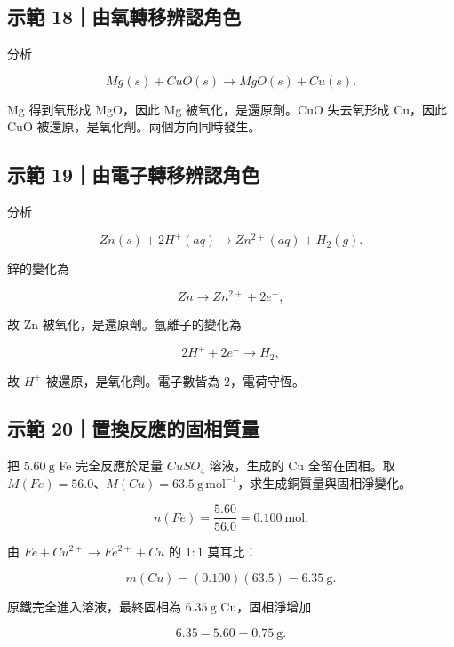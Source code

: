 \documentclass[11pt,a4paper]{article}
\begin{document}
\begin{HandoutWorkedExample}

\subsection{示範 18｜由氧轉移辨認角色}\label{ux793aux7bc4-18ux7531ux6c27ux8f49ux79fbux8fa8ux8a8dux89d2ux8272}

分析

\[
Mg(s)+CuO(s)\rightarrow MgO(s)+Cu(s).
\]

Mg 得到氧形成 MgO，因此 Mg 被氧化，是還原劑。CuO 失去氧形成 Cu，因此 CuO 被還原，是氧化劑。兩個方向同時發生。

\end{HandoutWorkedExample}

\begin{HandoutWorkedExample}

\subsection{示範 19｜由電子轉移辨認角色}\label{ux793aux7bc4-19ux7531ux96fbux5b50ux8f49ux79fbux8fa8ux8a8dux89d2ux8272}

分析

\[
Zn(s)+2H^+(aq)\rightarrow Zn^{2+}(aq)+H_2(g).
\]

鋅的變化為

\[
Zn\rightarrow Zn^{2+}+2e^-,
\]

故 Zn 被氧化，是還原劑。氫離子的變化為

\[
2H^++2e^-\rightarrow H_2,
\]

故 \(H^+\) 被還原，是氧化劑。電子數皆為 2，電荷守恆。

\end{HandoutWorkedExample}

\begin{HandoutWorkedExample}

\subsection{示範 20｜置換反應的固相質量}\label{ux793aux7bc4-20ux7f6eux63dbux53cdux61c9ux7684ux56faux76f8ux8ceaux91cf}

把 \(5.60\ \mathrm g\) Fe 完全反應於足量 \(CuSO_4\) 溶液，生成的 Cu 全留在固相。取 \(M(Fe)=56.0\)、\(M(Cu)=63.5\ \mathrm{g\,mol^{-1}}\)，求生成銅質量與固相淨變化。

\[
n(Fe)=\frac{5.60}{56.0}=0.100\ \mathrm{mol}.
\]

由 \(Fe+Cu^{2+}\rightarrow Fe^{2+}+Cu\) 的 \(1:1\) 莫耳比：

\[
m(Cu)=(0.100)(63.5)=6.35\ \mathrm g.
\]

原鐵完全進入溶液，最終固相為 \(6.35\ \mathrm g\) Cu，固相淨增加

\[
6.35-5.60=0.75\ \mathrm g.
\]

\end{HandoutWorkedExample}
\end{document}
